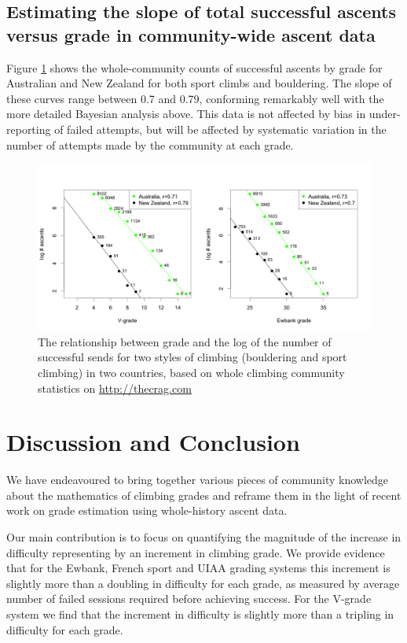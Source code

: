 \documentclass{article}
\begin{document}
\subsection*{Estimating the slope of total successful ascents versus grade in community-wide ascent data}

Figure \ref{fig.oneill} shows the whole-community counts of successful ascents by grade for Australian and New Zealand for both sport climbs and bouldering. The slope of these curves range between 0.7 and 0.79, conforming remarkably well with the more detailed Bayesian analysis above. This data is not affected by bias in under-reporting of failed attempts, but will be affected by systematic variation in the number of attempts made by the community at each grade.

\begin{figure}
\centering
\includegraphics[width=\textwidth]{figure1.png}
\caption{\small The relationship between grade and the log of the number of successful sends for two styles of climbing (bouldering and sport climbing) in two countries, based on whole climbing community statistics on \url{http://thecrag.com}}
\label{fig.oneill}
\end{figure}

\section*{Discussion and Conclusion}

We have endeavoured to bring together various pieces of community knowledge about the mathematics of climbing grades and reframe them in the light of recent work on grade estimation using whole-history ascent data.

Our main contribution is to focus on quantifying the magnitude of the increase in difficulty representing by an increment in climbing grade. We provide evidence that for the Ewbank, French sport and UIAA grading systems this increment is slightly more than a doubling in difficulty for each grade, as measured by average number of failed sessions required before achieving success. For the V-grade system we find that the increment in difficulty is slightly more than a tripling in difficulty for each grade.
\end{document}
